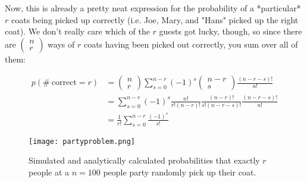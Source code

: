 Now, this is already a pretty neat expression for the probability of a *particular* $r$ coats being picked up correctly (i.e. Joe, Mary, and "Hans" picked up the right coat). We don't really care which of the $r$ guests got lucky, though, so since there are $\left(\begin{array}{c}n\\r\end{array}\right)$ ways of $r$ coats having been picked out correctly, you sum over all of them:

\begin{equation}
\begin{array}{ll}
p(\mathrm{\#\ correct} = r) &= \left(\begin{array}{c}n\\r\end{array}\right) \sum_{s=0}^{n-r} (-1)^s \left(\begin{array}{c}n-r\\s\end{array}\right)\frac{(n-r-s)!}{n!}\\
&= \sum_{s=0}^{n-r} (-1)^s \frac{n!}{r!(n-r)!}\frac{(n-r)!}{s!(n-r-s)!}\frac{(n-r-s)!}{n!}\\
&= \frac{1}{r!}\sum_{s=0}^{n-r} \frac{(-1)^s}{s!}
\end{array}
\end{equation}


\begin{figure}
\centering
    \texttt{[image: partyproblem.png]}
    \caption{Simulated and analytically calculated probabilities that exactly $r$ people at a $n=100$ people party randomly pick up their coat.}
    \label{fig:proba_partyproblem}
\end{figure}
